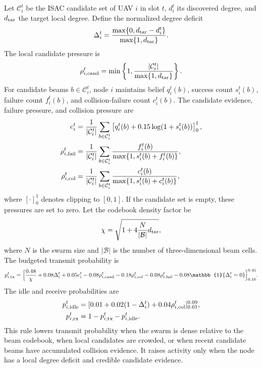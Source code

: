 Let $\mathcal{C}_i^t$ be the ISAC candidate set of UAV $i$ in slot $t$, $d_i^t$ its discovered degree, and $d_{\rm tar}$ the target local degree.
Define the normalized degree deficit
\begin{equation}
  \Delta_i^t = \frac{\max\{0,d_{\rm tar}-d_i^t\}}{\max\{1,d_{\rm tar}\}}.
\end{equation}
The local candidate pressure is
\begin{equation}
  \rho_{i,{\rm cand}}^t =
  \min\left\{1,\frac{|\mathcal{C}_i^t|}{\max\{1,d_{\rm tar}\}}\right\}.
\end{equation}
For candidate beams $b\in\mathcal{C}_i^t$, node $i$ maintains belief $q_i^t(b)$, success count $s_i^t(b)$, failure count $f_i^t(b)$, and collision-failure count $c_i^t(b)$.
The candidate evidence, failure pressure, and collision pressure are
\begin{align}
  e_i^t &=
  \frac{1}{|\mathcal{C}_i^t|}
  \sum_{b\in\mathcal{C}_i^t}
  \left[q_i^t(b)+0.15\log(1+s_i^t(b))\right]_{0}^{1},\\
  \rho_{i,{\rm fail}}^t &=
  \frac{1}{|\mathcal{C}_i^t|}
  \sum_{b\in\mathcal{C}_i^t}
  \frac{f_i^t(b)}{\max\{1,s_i^t(b)+f_i^t(b)\}},\\
  \rho_{i,{\rm col}}^t &=
  \frac{1}{|\mathcal{C}_i^t|}
  \sum_{b\in\mathcal{C}_i^t}
  \frac{c_i^t(b)}{\max\{1,s_i^t(b)+c_i^t(b)\}},
\end{align}
where $[\cdot]_0^1$ denotes clipping to $[0,1]$.
If the candidate set is empty, these pressures are set to zero.
Let the codebook density factor be
\begin{equation}
  \chi = \sqrt{1 + 4 \frac{N}{|\mathcal{B}|} d_{\rm tar}},
\end{equation}
where $N$ is the swarm size and $|\mathcal{B}|$ is the number of three-dimensional beam cells.
The budgeted transmit probability is
\begin{equation}
\begin{split}
  p_{i,{\rm tx}}^t =
  \Big[
  \frac{0.48}{\chi}
  +0.08\Delta_i^t
  +0.05 e_i^t
  -0.08\rho_{i,{\rm cand}}^t
  -0.18\rho_{i,{\rm col}}^t
  -0.08\rho_{i,{\rm fail}}^t
  -0.08\mathbb{1}\{\Delta_i^t=0\}
  \Big]_{0.16}^{0.45}.
\end{split}
\label{eq:budgeted_tx_probability}
\end{equation}
The idle and receive probabilities are
\begin{align}
  p_{i,{\rm idle}}^t &=
  [0.01+0.02(1-\Delta_i^t)+0.04\rho_{i,{\rm col}}^t]_{0.01}^{0.09},\\
  p_{i,{\rm rx}}^t &= 1-p_{i,{\rm tx}}^t-p_{i,{\rm idle}}^t .
\end{align}
This rule lowers transmit probability when the swarm is dense relative to the beam codebook, when local candidates are crowded, or when recent candidate beams have accumulated collision evidence.
It raises activity only when the node has a local degree deficit and credible candidate evidence.


